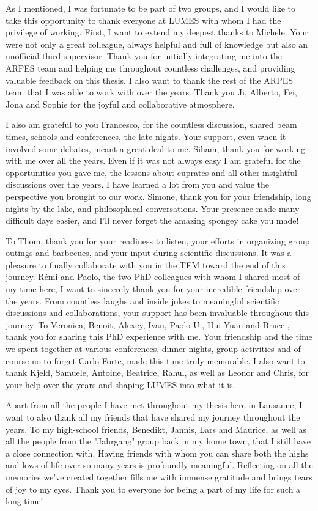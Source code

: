 As I mentioned, I was fortunate to be part of two groups, and I would like to take this opportunity to thank everyone at LUMES with whom I had the privilege of working.
First, I want to extend my deepest thanks to Michele.
Your were not only a great colleague, always helpful and full of knowledge but also an unofficial third supervisor.
Thank you for initially integrating me into the ARPES team and helping me throughout countless challenges, and providing valuable feedback on this thesis.
I also want to thank the rest of the ARPES team that I was able to work with over the years. Thank you Ji, Alberto, Fei, Jona and Sophie for the joyful and collaborative atmosphere.

I also am grateful to you Francesco, for the countless discussion, shared beam times, schools and conferences, the late nights. Your support, even when it involved some debates, meant a great deal to me.
Siham, thank you for working with me over all the years. Even if it was not always easy I am grateful for the opportunities you gave me, the lessons about cuprates and all other insightful discussions over the years. I have learned a lot from you and value the perspective you brought to our work.
Simone, thank you for your friendship, long nights by the lake, and philosophical conversations.
Your presence made many difficult days easier, and I’ll never forget the amazing spongey cake you made!

To Thom, thank you for your readiness to listen, your efforts in organizing group outings and barbecues, and your input during scientific discussions. It was a pleasure to finally collaborate with you in the TEM toward the end of this journey.
Rémi and Paolo, the two PhD colleagues with whom I shared most of my time here, I want to sincerely thank you for your incredible friendship over the years. From countless laughs and inside jokes to meaningful scientific discussions and collaborations, your support has been invaluable throughout this journey.
To Veronica, Benoit, Alexey, Ivan, Paolo U., Hui-Yuan and Bruce , thank you for sharing this PhD experience with me.
Your friendship and the time we spent together at various conferences, dinner nights, group activities and of course no to forget Carlo Forte, made this time truly memorable.
I also want to thank Kjeld, Samuele, Antoine, Beatrice, Rahul, as well as Leonor and Chris, for your help over the years and shaping LUMES into what it is.\hfill\break

Apart from all the people I have met throughout my thesis here in Lausanne, I want to also thank all my friends that have shared my journey throughout the years.
To my high-school friends, Benedikt, Jannis, Lars and Maurice, as well as all the people from the "Jahrgang" group back in my home town, that I still have a close connection with.
Having friends with whom you can share both the highs and lows of life over so many years is profoundly meaningful.
Reflecting on all the memories we’ve created together fills me with immense gratitude and brings tears of joy to my eyes.
Thank you to everyone for being a part of my life for such a long time!\hfill\break

